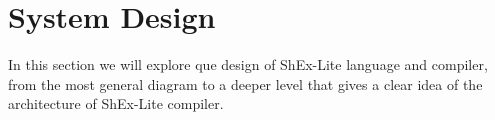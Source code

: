 \setchapterpreamble[u]{\margintoc}
\chapter{System Design}

In this section we will explore que design of ShEx-Lite language and compiler, from the most general diagram to a deeper level that gives a clear idea of the architecture of ShEx-Lite compiler.


